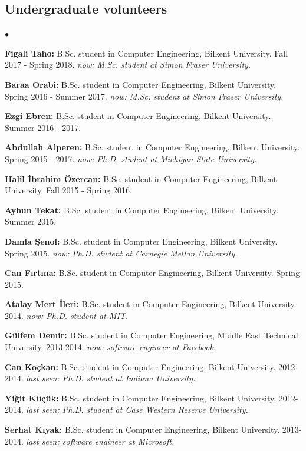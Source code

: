 \documentclass[margin,line]{res}
\newenvironment{list2}{
  \begin{list}{$\bullet$}{%
      \setlength{\itemsep}{0.1cm}
      \setlength{\parsep}{0in} \setlength{\parskip}{0in}
      \setlength{\topsep}{0in} \setlength{\partopsep}{0in} 
      \setlength{\leftmargin}{0.2in}}}{\end{list}}
\begin{document}
\begin{resume}
\subsection{\small \sc Undergraduate volunteers}
\begin{list2}
\item {\bf Figali Taho:} B.Sc. student in Computer Engineering,  Bilkent University. Fall 2017 - Spring 2018. {\it now: M.Sc. student at Simon Fraser University.}
\item {\bf Baraa Orabi:} B.Sc. student in Computer Engineering,  Bilkent University. Spring 2016 - Summer 2017. {\it now: M.Sc. student at Simon Fraser University.}
\item {\bf Ezgi Ebren:} B.Sc. student in Computer Engineering,  Bilkent University. Summer 2016 - 2017.
\item {\bf Abdullah Alperen:} B.Sc. student in Computer Engineering,  Bilkent University. Spring 2015 - 2017. {\it now: Ph.D. student at Michigan State University.}
\item {\bf Halil İbrahim Özercan:} B.Sc. student in Computer Engineering,  Bilkent University. Fall 2015 - Spring 2016. 
\item {\bf Ayhun Tekat:} B.Sc. student in Computer Engineering,  Bilkent University. Summer 2015. 
\item {\bf Damla Şenol:} B.Sc. student in Computer Engineering,  Bilkent University. Spring 2015. {\it now: Ph.D. student at Carnegie Mellon University.}
\item {\bf Can Fırtına:} B.Sc. student in Computer Engineering,  Bilkent University. Spring 2015. 
\item {\bf Atalay Mert İleri:} B.Sc. student in Computer Engineering, Bilkent University. 2014. {\it now: Ph.D. student at MIT.}
\item {\bf Gülfem Demir:} B.Sc. student in Computer Engineering,  Middle East Technical University. 2013-2014. {\it now: software engineer at Facebook.}
\item {\bf Can Koçkan:} B.Sc. student in Computer Engineering,  Bilkent University.  2012-2014. {\it last seen: Ph.D. student at Indiana University.}
\item {\bf Yiğit Küçük:} B.Sc. student in Computer Engineering,  Bilkent University. 2012-2014. {\it last seen: Ph.D. student at Case Western Reserve University.}
\item {\bf Serhat Kıyak:} B.Sc. student in Computer Engineering,  Bilkent University. 2013-2014. {\it last seen: software engineer at Microsoft.}
\end{list2}



\end{resume}
\end{document}
